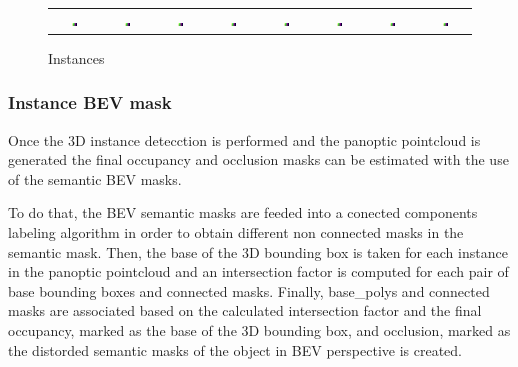 \begin{figure}[h]
\begin{tabular}{c c c c c c c c}
        \includegraphics[width=0.12\textwidth]{images/shared/no_signal.jpg} & 
        \includegraphics[width=0.12\textwidth]{images/shared/no_signal.jpg} & 
        \includegraphics[width=0.12\textwidth]{images/shared/no_signal.jpg} &
        \includegraphics[width=0.12\textwidth]{images/shared/no_signal.jpg} &   
        \includegraphics[width=0.12\textwidth]{images/shared/no_signal.jpg} & 
        \includegraphics[width=0.12\textwidth]{images/shared/no_signal.jpg} &
        \includegraphics[width=0.12\textwidth]{images/shared/no_signal.jpg} &
        \includegraphics[width=0.12\textwidth]{images/shared/no_signal.jpg} \\
    \end{tabular}    
    \caption{Instances}
    \label{fig:instance_scene_images}
\end{figure}


\subsubsection{Instance BEV mask}
Once the 3D instance detecction is performed and the panoptic pointcloud is generated the final occupancy and occlusion masks can be estimated with the use of the semantic BEV masks. 

To do that, the BEV semantic masks are feeded into a conected components labeling algorithm in order to obtain different non connected masks in the semantic mask. Then, the base of the 3D bounding box is taken for each instance in the panoptic pointcloud and an intersection factor is computed for each pair of base bounding boxes and connected masks. Finally, base\_polys and connected masks are associated based on the calculated intersection factor and the final occupancy, marked as the base of the 3D bounding box, and occlusion, marked as the distorded semantic masks of the object in BEV perspective is created.

